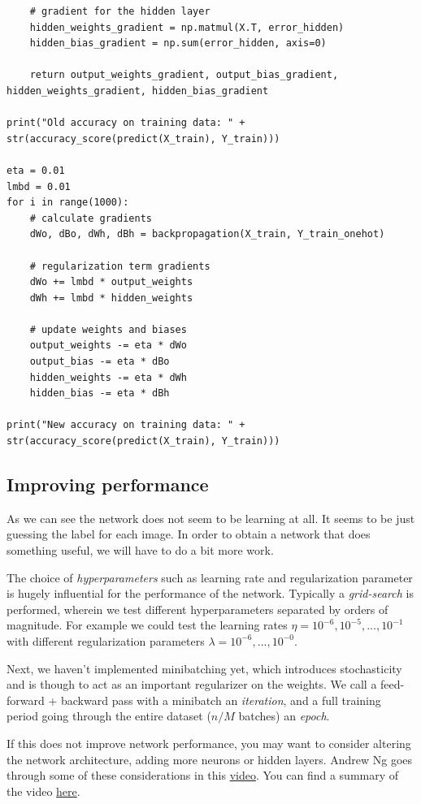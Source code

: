 \documentclass[%
oneside,                 %
final,                   %
10pt]{article}
\begin{document}
\begin{verbatim}
    # gradient for the hidden layer
    hidden_weights_gradient = np.matmul(X.T, error_hidden)
    hidden_bias_gradient = np.sum(error_hidden, axis=0)

    return output_weights_gradient, output_bias_gradient, hidden_weights_gradient, hidden_bias_gradient

print("Old accuracy on training data: " + str(accuracy_score(predict(X_train), Y_train)))

eta = 0.01
lmbd = 0.01
for i in range(1000):
    # calculate gradients
    dWo, dBo, dWh, dBh = backpropagation(X_train, Y_train_onehot)
    
    # regularization term gradients
    dWo += lmbd * output_weights
    dWh += lmbd * hidden_weights
    
    # update weights and biases
    output_weights -= eta * dWo
    output_bias -= eta * dBo
    hidden_weights -= eta * dWh
    hidden_bias -= eta * dBh

print("New accuracy on training data: " + str(accuracy_score(predict(X_train), Y_train)))
\end{verbatim}

\subsection*{Improving performance}

As we can see the network does not seem to be learning at all. It seems to be just guessing the label for each image.  
In order to obtain a network that does something useful, we will have to do a bit more work.  

The choice of \emph{hyperparameters} such as learning rate and regularization parameter is hugely influential for the performance of the network. Typically a \emph{grid-search} is performed, wherein we test different hyperparameters separated by orders of magnitude. For example we could test the learning rates $\eta = 10^{-6}, 10^{-5},...,10^{-1}$ with different regularization parameters $\lambda = 10^{-6},...,10^{-0}$.  

Next, we haven't implemented minibatching yet, which introduces stochasticity and is though to act as an important regularizer on the weights. We call a feed-forward + backward pass with a minibatch an \emph{iteration}, and a full training period
going through the entire dataset ($n/M$ batches) an \emph{epoch}.

If this does not improve network performance, you may want to consider altering the network architecture, adding more neurons or hidden layers.  
Andrew Ng goes through some of these considerations in this \href{{https://youtu.be/F1ka6a13S9I}}{video}. You can find a summary of the video \href{{https://kevinzakka.github.io/2016/09/26/applying-deep-learning/}}{here}.  
\end{document}
